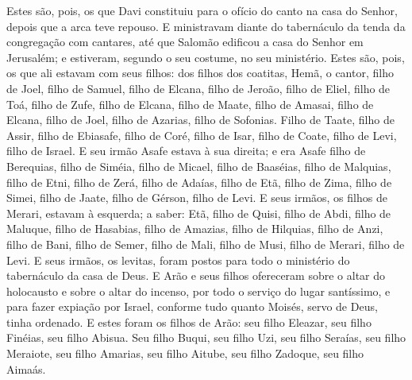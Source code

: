 Estes são, pois, os que Davi constituiu para o ofício do canto na
casa do Senhor, depois que a arca teve repouso. E ministravam
diante do tabernáculo da tenda da congregação com cantares, até que
Salomão edificou a casa do Senhor em Jerusalém; e estiveram, segundo
o seu costume, no seu ministério. Estes são, pois, os que ali
estavam com seus filhos: dos filhos dos coatitas, Hemã, o cantor,
filho de Joel, filho de Samuel, filho de Elcana, filho de
Jeroão, filho de Eliel, filho de Toá, filho de Zufe, filho de
Elcana, filho de Maate, filho de Amasai, filho de Elcana,
filho de Joel, filho de Azarias, filho de Sofonias. Filho de
Taate, filho de Assir, filho de Ebiasafe, filho de Coré,
filho de Isar, filho de Coate, filho de Levi, filho de
Israel. E seu irmão Asafe estava à sua direita; e era Asafe
filho de Berequias, filho de Siméia, filho de Micael, filho
de Baaséias, filho de Malquias, filho de Etni, filho de Zerá,
filho de Adaías, filho de Etã, filho de Zima, filho de Simei,
filho de Jaate, filho de Gérson, filho de Levi. E seus
irmãos, os filhos de Merari, estavam à esquerda; a saber: Etã, filho
de Quisi, filho de Abdi, filho de Maluque, filho de Hasabias,
filho de Amazias, filho de Hilquias, filho de Anzi, filho de
Bani, filho de Semer, filho de Mali, filho de Musi, filho de
Merari, filho de Levi. E seus irmãos, os levitas, foram
postos para todo o ministério do tabernáculo da casa de Deus.
E Arão e seus filhos ofereceram sobre o altar do holocausto e
sobre o altar do incenso, por todo o serviço do lugar santíssimo, e
para fazer expiação por Israel, conforme tudo quanto Moisés, servo
de Deus, tinha ordenado. E estes foram os filhos de Arão: seu
filho Eleazar, seu filho Finéias, seu filho Abisua. Seu filho
Buqui, seu filho Uzi, seu filho Seraías, seu filho Meraiote,
seu filho Amarias, seu filho Aitube, seu filho Zadoque, seu
filho Aimaás.

